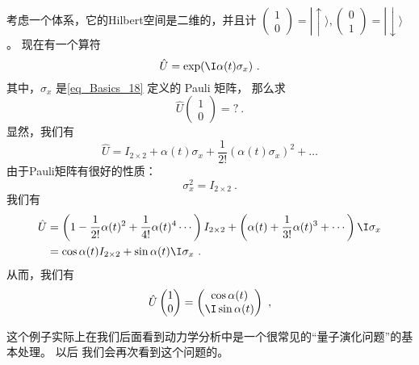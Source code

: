 \begin{exercise}{}
考虑一个体系，它的Hilbert空间是二维的，并且计 $\left(\begin{matrix}1 \\0\end{matrix}\right) = |\!\uparrow\rangle, \left(\begin{matrix}0 \\1\end{matrix}\right) = |\!\downarrow\rangle$。 现在有一个算符
\begin{equation}
\hat{U} = \exp(\I\alpha(t) \sigma_x)~.
\end{equation}
其中，$\sigma_x$ 是\autoref{eq_Basics_18} 定义的 Pauli 矩阵， 那么求
\begin{equation}
\hat{U} \left(\begin{matrix}1 \\0\end{matrix}\right) = ? ~.
\end{equation}
显然，我们有
\begin{equation}
\hat U= I_{2\times2} + \alpha(t) \sigma_x + \frac{1}{2!}\left(\alpha(t) \sigma_x\right)^2 + \dots
\end{equation}
由于Pauli矩阵有很好的性质：
\begin{equation}
\sigma_x^2 = I_{2\times2}~.
\end{equation}
我们有
\begin{equation}
\begin{split}\hat U &= \left(1 - \frac{1}{2!}\alpha(t)^2 + \frac{1}{4!}\alpha(t)^4  \cdots\right)  I_{2\times2} + \left(\alpha(t) + \frac{1}{3!}\alpha(t)^3 + \cdots \right)\I \sigma_x\\
& = \cos\alpha(t) I_{2\times2} + \sin\alpha(t) \I\sigma_x ~.
\end{split}
\end{equation}
从而，我们有
\begin{equation}
\hat U \left(\begin{matrix}1 \\0\end{matrix}\right)  =  \left(\begin{matrix}\cos\alpha(t) \\ \I \sin\alpha(t)\end{matrix}\right)~,
\end{equation}

这个例子实际上在我们后面看到动力学分析中是一个很常见的``量子演化问题''的基本处理。 以后%
我们会再次看到这个问题的。
\end{exercise}

